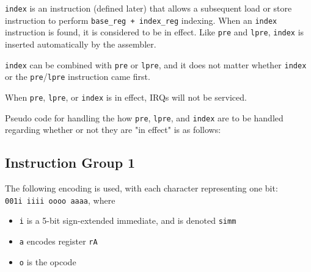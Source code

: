 \documentclass{article}
\begin{document}
	\texttt{index} is an instruction (defined later) that allows a
	subsequent load or store instruction to perform \texttt{base\_reg +
	index\_reg} indexing. When an \texttt{index} instruction is found, it
	is considered to be in effect. Like \texttt{pre} and \texttt{lpre},
	\texttt{index} is inserted automatically by the assembler.

	\texttt{index} can be combined with \texttt{pre} or \texttt{lpre}, and
	it does not matter whether \texttt{index} or the
	\texttt{pre}/\texttt{lpre} instruction came first.



	When \texttt{pre}, \texttt{lpre}, or \texttt{index} is in effect,
	IRQs will not be serviced.

	Pseudo code for handling the how \texttt{pre}, \texttt{lpre}, and
	\texttt{index} are to be handled regarding whether or not they are "in
	effect" is as follows:




	\subsection{Instruction Group 1}
	The following encoding is used, with each character representing one
	bit: \\
	\texttt{001i iiii oooo aaaa}, where

	\singlespacing
	\begin{itemize}
	\item \texttt{i} is a 5-bit sign-extended immediate, and is denoted
	\texttt{simm}
	\item \texttt{a} encodes register \texttt{rA}
	\item \texttt{o} is the opcode
	\end{itemize}
	\doublespacing
\end{document}

